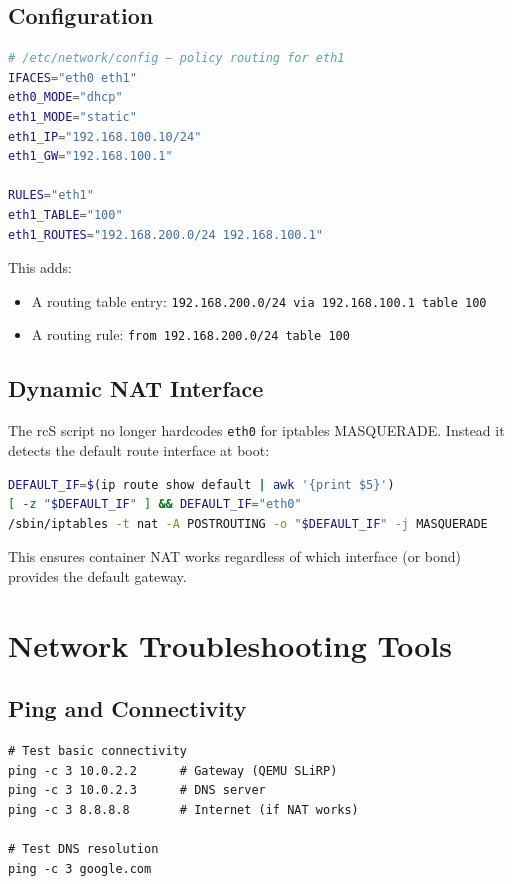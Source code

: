 \subsection{Configuration}

\begin{lstlisting}[language=bash]
# /etc/network/config — policy routing for eth1
IFACES="eth0 eth1"
eth0_MODE="dhcp"
eth1_MODE="static"
eth1_IP="192.168.100.10/24"
eth1_GW="192.168.100.1"

RULES="eth1"
eth1_TABLE="100"
eth1_ROUTES="192.168.200.0/24 192.168.100.1"
\end{lstlisting}

This adds:
\begin{itemize}[nosep]
  \item A routing table entry: \texttt{192.168.200.0/24 via 192.168.100.1
        table 100}
  \item A routing rule: \texttt{from 192.168.200.0/24 table 100}
\end{itemize}

\subsection{Dynamic NAT Interface}

The rcS script no longer hardcodes \texttt{eth0} for iptables MASQUERADE.
Instead it detects the default route interface at boot:

\begin{lstlisting}[language=bash]
DEFAULT_IF=$(ip route show default | awk '{print $5}')
[ -z "$DEFAULT_IF" ] && DEFAULT_IF="eth0"
/sbin/iptables -t nat -A POSTROUTING -o "$DEFAULT_IF" -j MASQUERADE
\end{lstlisting}

This ensures container NAT works regardless of which interface (or bond)
provides the default gateway.

\section{Network Troubleshooting Tools}

\subsection{Ping and Connectivity}

\begin{lstlisting}
# Test basic connectivity
ping -c 3 10.0.2.2      # Gateway (QEMU SLiRP)
ping -c 3 10.0.2.3      # DNS server
ping -c 3 8.8.8.8       # Internet (if NAT works)

# Test DNS resolution
ping -c 3 google.com
\end{lstlisting}

